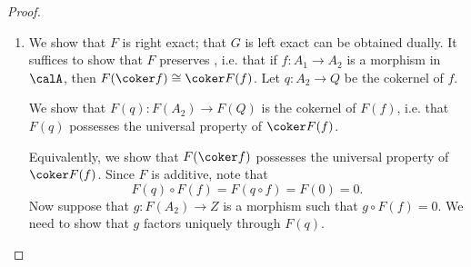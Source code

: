 \begin{proof}
\begin{enumerate}
        \item We show that $F$ is right exact; that $G$ is left exact can be obtained dually. It suffices to show that $F$ preserves , i.e. that if $f: A_1 \to A_2$ is a morphism in $\calA$, then $F(\coker f) \cong \coker F(f)$. Let $q: A_2 \to Q$ be the cokernel of $f$. 
        \begin{center}
        \end{center}
        We show that $F(q): F(A_2) \to F(Q)$ is the cokernel of $F(f)$, i.e. that $F(q)$ possesses the universal property of $\coker F(f)$. 
        \begin{center}
        \end{center}
        Equivalently, we show that $F(\coker f)$ possesses the universal property of $\coker F(f)$. Since $F$ is additive, note that 
        $$F(q) \circ F(f) = F(q \circ f) = F(0) = 0.$$
        Now suppose that $g: F(A_2) \to Z$ is a morphism such that $g \circ F(f) = 0$. We need to show that $g$ factors uniquely through $F(q)$. 


\end{enumerate}
\end{proof}
